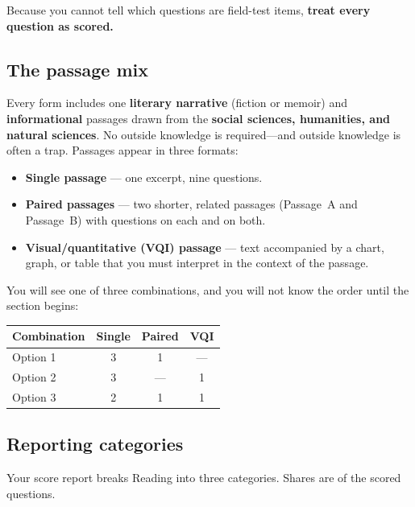 \documentclass[11pt]{article}
\begin{document}
Because you cannot tell which questions are field-test items, \textbf{treat every question as scored.}

\subsection{The passage mix}
Every form includes one \textbf{literary narrative} (fiction or memoir) and \textbf{informational} passages drawn from the \textbf{social sciences, humanities, and natural sciences}. No outside knowledge is required---and outside knowledge is often a trap. Passages appear in three formats:

\begin{itemize}
  \item \textbf{Single passage} --- one excerpt, nine questions.
  \item \textbf{Paired passages} --- two shorter, related passages (Passage~A and Passage~B) with questions on each and on both.
  \item \textbf{Visual/quantitative (VQI) passage} --- text accompanied by a chart, graph, or table that you must interpret in the context of the passage.
\end{itemize}

You will see one of three combinations, and you will not know the order until the section begins:

\begin{center}
\begin{tabular}{@{}lccc@{}}
\toprule
\textbf{Combination} & \textbf{Single} & \textbf{Paired} & \textbf{VQI}\\
\midrule
Option 1 & 3 & 1 & ---\\
Option 2 & 3 & --- & 1\\
Option 3 & 2 & 1 & 1\\
\bottomrule
\end{tabular}
\end{center}

\subsection{Reporting categories}
Your score report breaks Reading into three categories. Shares are of the scored questions.
\end{document}
